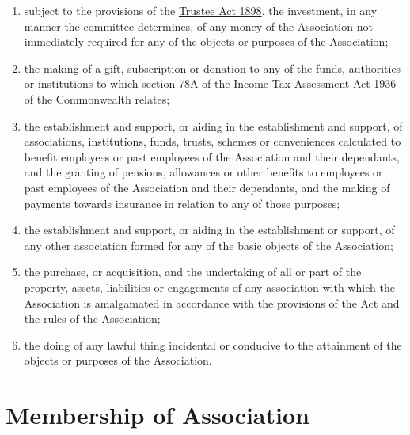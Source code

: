 \documentclass[a4paper,11pt]{article}
\begin{document}
\begin{enumerate}
	\item subject to the provisions of the \href{https://www.legislation.tas.gov.au/view/html/inforce/2019-05-06/act-1898-034}{Trustee Act 1898}, the investment, in any manner the committee determines, of any money of the Association not immediately required for any of the objects or purposes of the Association;
	\item the making of a gift, subscription or donation to any of the funds, authorities or institutions to which section 78A of the \href{https://www.legislation.gov.au/Series/C1936A00027}{Income Tax Assessment Act 1936} of the Commonwealth relates;
	\item the establishment and support, or aiding in the establishment and support, of associations, institutions, funds, trusts, schemes or conveniences calculated to benefit employees or past employees of the Association and their dependants, and the granting of pensions, allowances or other benefits to employees or past employees of the Association and their dependants, and the making of payments towards insurance in relation to any of those purposes;
	\item the establishment and support, or aiding in the establishment or support, of any other association formed for any of the basic objects of the Association;
	\item the purchase, or acquisition, and the undertaking of all or part of the property, assets, liabilities or engagements of any association with which the Association is amalgamated in accordance with the provisions of the Act and the rules of the Association;
	\item the doing of any lawful thing incidental or conducive to the attainment of the objects or purposes of the Association.
\end{enumerate}

\section{Membership of Association}
\label{rule:membership}
\end{document}
